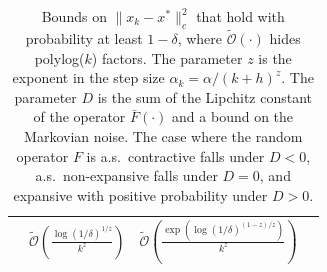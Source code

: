 \documentclass{article}
\newcommand{\lrp}[1]{\left( #1 \right)}
\begin{document}
\begin{enumerate}
\begin{table}[ht!]
\begin{center}
\begin{tabular}{|
    >{\centering\arraybackslash}m{1.5cm}||
    >{\centering\arraybackslash}m{2cm}|
    >{\centering\arraybackslash}m{2.5cm}|
    >{\centering\arraybackslash}m{3.5cm}|}
 & $\tilde{\mathcal{O}}\left(\frac{\log(1/\delta)^{1/z}}{k^z}\right)$
 & $\tilde{\mathcal{O}}\lrp{\frac{\exp\left(\log(1/\delta)^{(1-z)/z}\right)}{k^z}}$ \\ 
 \hline
\end{tabular}
\end{center}
\caption{Bounds on $\|x_k-x^*\|_c^2$ that hold with probability at least $1-\delta$, where $\tilde{\mathcal{O}}(\cdot)$ hides polylog($k$) factors. The parameter $z$ is the exponent in the step size $\alpha_k=\alpha/(k+h)^z$. The parameter $D$ is the sum of the Lipchitz constant of the operator $\bar{F}(\cdot)$ and a bound on the Markovian noise. The case where the random operator $F$ is a.s.\ contractive falls under $D<0$, a.s.\ non-expansive falls under $D=0$, and expansive with positive probability under $D>0$. %
}
\label{tab:summary}
\end{table}


\end{enumerate}
\end{document}
